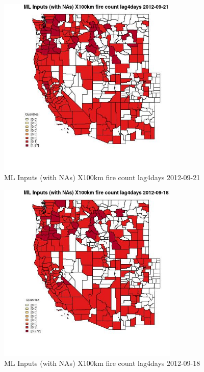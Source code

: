 \clearpage 

\begin{figure} 
\centering  
\includegraphics[width=0.77\textwidth]{Code_Outputs/Report_ML_input_PM25_Step4_part_e_de_duplicated_aves_compiled_2019-05-14wNAs_CountyX100km_fire_count_lag4daysMean2012-09-21_2012-09-21.jpg} 
\caption{\label{fig:Report_ML_input_PM25_Step4_part_e_de_duplicated_aves_compiled_2019-05-14wNAsCountyX100km_fire_count_lag4daysMean2012-09-21_2012-09-21}ML Inputs (with NAs) X100km fire count lag4days 2012-09-21} 
\end{figure} 
 

\begin{figure} 
\centering  
\includegraphics[width=0.77\textwidth]{Code_Outputs/Report_ML_input_PM25_Step4_part_e_de_duplicated_aves_compiled_2019-05-14wNAs_CountyX100km_fire_count_lag4daysMean2012-09-18_2012-09-18.jpg} 
\caption{\label{fig:Report_ML_input_PM25_Step4_part_e_de_duplicated_aves_compiled_2019-05-14wNAsCountyX100km_fire_count_lag4daysMean2012-09-18_2012-09-18}ML Inputs (with NAs) X100km fire count lag4days 2012-09-18} 
\end{figure} 
 

